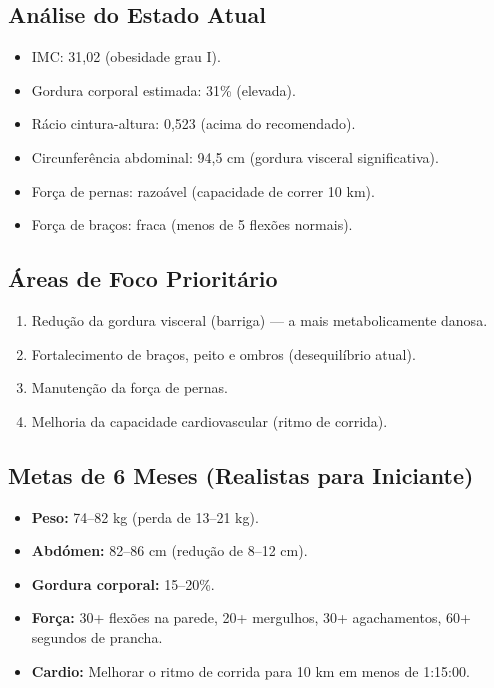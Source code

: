 \documentclass[12pt,a4paper]{scrartcl}
\begin{document}
\subsection{Análise do Estado Atual}
\begin{itemize}
    \item IMC: 31,02 (obesidade grau I).
    \item Gordura corporal estimada: 31\% (elevada).
    \item Rácio cintura-altura: 0,523 (acima do recomendado).
    \item Circunferência abdominal: 94,5 cm (gordura visceral significativa).
    \item Força de pernas: razoável (capacidade de correr 10 km).
    \item Força de braços: fraca (menos de 5 flexões normais).
\end{itemize}

\subsection{Áreas de Foco Prioritário}
\begin{enumerate}
    \item Redução da gordura visceral (barriga) — a mais metabolicamente danosa.
    \item Fortalecimento de braços, peito e ombros (desequilíbrio atual).
    \item Manutenção da força de pernas.
    \item Melhoria da capacidade cardiovascular (ritmo de corrida).
\end{enumerate}

\subsection{Metas de 6 Meses (Realistas para Iniciante)}
\begin{itemize}
    \item \textbf{Peso:} 74–82 kg (perda de 13–21 kg).
    \item \textbf{Abdómen:} 82–86 cm (redução de 8–12 cm).
    \item \textbf{Gordura corporal:} 15–20\%.
    \item \textbf{Força:} 30+ flexões na parede, 20+ mergulhos, 30+ agachamentos, 60+ segundos de prancha.
    \item \textbf{Cardio:} Melhorar o ritmo de corrida para 10 km em menos de 1:15:00.
\end{itemize}
\end{document}
